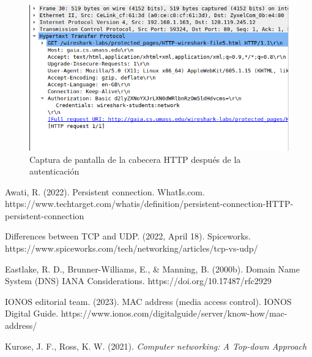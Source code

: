 \documentclass[spanish]{report} %
\begin{document}
\begin{figure}[h]
\begin{center}
\includegraphics[scale=.5]{../img/14.png}
\end{center}
\caption{Captura de pantalla de la cabecera HTTP después de la autenticación}
\end{figure}

\begin{thebibliography}{X}

\item Awati, R. (2022). Persistent connection. WhatIs.com.
https://www.techtarget.com/whatis/definition/persistent-connection-HTTP-persistent-connection

\item Differences between TCP and UDP. (2022, April 18). Spiceworks.
https://www.spiceworks.com/tech/networking/articles/tcp-vs-udp/

\item Eastlake, R. D., Brunner-Williams, E., \& Manning, B. (2000b). Domain Name
System (DNS) IANA Considerations. https://doi.org/10.17487/rfc2929

\item IONOS editorial team. (2023). MAC address (media access control). IONOS
Digital Guide. https://www.ionos.com/digitalguide/server/know-how/mac-address/

\item Kurose, J. F., Ross, K. W. (2021). \textit{Computer networking: A Top-down
Approach}

\end{thebibliography}
\end{document}
